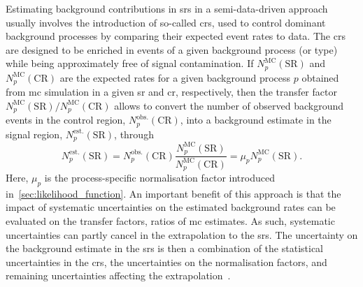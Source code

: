 Estimating background contributions in \glspl{sr} in a semi-data-driven approach usually involves the introduction of so-called \glspl{cr}, used to control dominant background processes by comparing their expected event rates to data.
The \glspl{cr} are designed to be enriched in events of a given background process (or type) while being approximately free of signal contamination.
If $N_p^\mathrm{MC}(\mathrm{SR})$ and $N_p^\mathrm{MC}(\mathrm{CR})$ are the expected rates for a given background process $p$ obtained from \gls{mc} simulation in a given \gls{sr} and \gls{cr}, respectively, then the transfer factor $N_p^\mathrm{MC}(\mathrm{SR})/N_p^\mathrm{MC}(\mathrm{CR})$ allows to convert the number of observed background events in the control region, $N_p^\mathrm{obs.}(\mathrm{CR})$, into a background estimate in the signal region, $N_p^\mathrm{est.}(\mathrm{SR})$, through
\begin{equation}
	N_p^\mathrm{est.}(\mathrm{SR}) = N_p^\mathrm{obs.}(\mathrm{CR}) \frac{N_p^\mathrm{MC}(\mathrm{SR})}{N_p^\mathrm{MC}(\mathrm{CR})} = \mu_p N_p^\mathrm{MC}(\mathrm{SR}).
	\label{eq:transfer_factor}
\end{equation}
Here, $\mu_p$ is the process-specific normalisation factor introduced in~\cref{sec:likelihood_function}.
An important benefit of this approach is that the impact of systematic uncertainties on the estimated background rates can be evaluated on the transfer factors, \ie ratios of \gls{mc} estimates.
As such, systematic uncertainties can partly cancel in the extrapolation to the \glspl{sr}.
The uncertainty on the background estimate in the \glspl{sr} is then a combination of the statistical uncertainties in the \glspl{cr}, the uncertainties on the normalisation factors, and remaining uncertainties affecting the extrapolation~\cite{HistFitter:2014wma}.

